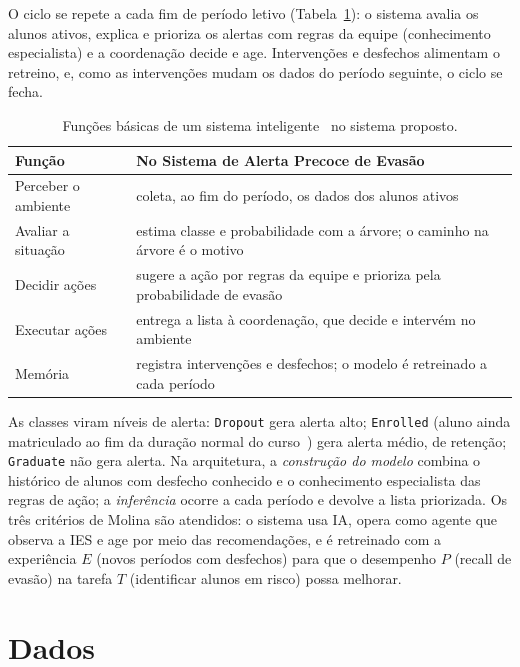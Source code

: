 \documentclass[runningheads]{llncs}
\begin{document}
O ciclo se repete a cada fim de período letivo (Tabela~\ref{tab:funcoes}): o sistema
avalia os alunos ativos, explica e prioriza os alertas com regras da equipe
(conhecimento especialista) e a coordenação decide e age. Intervenções e desfechos
alimentam o retreino, e, como as intervenções mudam os dados do período seguinte, o
ciclo se fecha.

\begin{table}[t]
\caption{Funções básicas de um sistema inteligente~\cite{molina2020} no sistema
proposto.}\label{tab:funcoes}
\centering\footnotesize
\begin{tabularx}{\textwidth}{@{}lX@{}}
\toprule
Função & No Sistema de Alerta Precoce de Evasão\\
\midrule
Perceber o ambiente & coleta, ao fim do período, os dados dos alunos ativos\\
Avaliar a situação & estima classe e probabilidade com a árvore; o caminho na árvore é o motivo\\
Decidir ações & sugere a ação por regras da equipe e prioriza pela probabilidade de evasão\\
Executar ações & entrega a lista à coordenação, que decide e intervém no ambiente\\
Memória & registra intervenções e desfechos; o modelo é retreinado a cada período\\
\bottomrule
\end{tabularx}
\end{table}

As classes viram níveis de alerta: \texttt{Dropout} gera alerta alto; \texttt{Enrolled}
(aluno ainda matriculado ao fim da duração normal do curso~\cite{realinho2022}) gera
alerta médio, de retenção; \texttt{Graduate} não gera alerta. Na arquitetura, a
\emph{construção do modelo} combina o histórico de alunos com desfecho conhecido e o
conhecimento especialista das regras de ação; a \emph{inferência} ocorre a cada período
e devolve a lista priorizada. Os três critérios de Molina são atendidos: o sistema usa
IA, opera como agente que observa a IES e age por meio das recomendações, e é
retreinado com a experiência $E$ (novos períodos com desfechos) para que o desempenho
$P$ (recall de evasão) na tarefa $T$ (identificar alunos em risco) possa melhorar.

\section{Dados}
\end{document}
